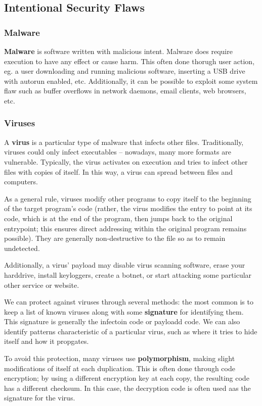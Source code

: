 \documentclass[12pt]{article}
\begin{document}
\subsection{Intentional Security Flaws}

\subsubsection{Malware}
{\bf Malware} is software written with malicious intent. Malware does require execution to have any effect or cause harm. This often done thorugh user action, eg. a user downloading and running malicious software, inserting a USB drive with autorun enabled, etc. Additionally, it can be possible to exploit some system flaw such as buffer overflows in network daemons, email clients, web browsers, etc.

\subsubsection{Viruses}
A {\bf virus} is a particular type of malware that infects other files. Traditionally, viruses could only infect executables -- nowadays, many more formats are vulnerable. Typically, the virus activates on execution and tries to infect other files with copies of itself. In this way, a virus can spread between files and computers.

As a general rule, viruses modify other programs to copy itself to the beginning of the target program's code (rather, the virus modifies the entry to point at its code, which is at the end of the program, then jumps back to the original entrypoint; this ensures direct addressing within the original program remains possible). They are generally non-destructive to the file so as to remain undetected.

Additionally, a virus' payload may disable virus scanning software, erase your harddrive, install keyloggers, create a botnet, or start attacking some particular other service or website.

We can protect against viruses through several methods: the most common is to keep a list of known viruses along with some {\bf signature} for identifying them. This signature is generally the infectoin code or payloadd code. We can also identify patterns characteristic of a particular virus, such as where it tries to hide itself and how it propgates.

To avoid this protection, many viruses use {\bf polymorphism}, making slight modifications of itself at each duplication. This is often done through code encryption; by using a different encryption key at each copy, the resulting code has a different checksum. In this case, the decryption code is often used aas the signature for the virus.
\end{document}
